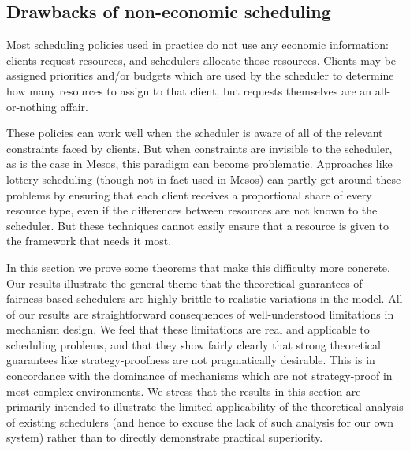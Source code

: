 \documentclass{acm_proc_article-sp}
\begin{document}
\subsection{Drawbacks of non-economic scheduling}\label{drawbacks}
Most scheduling policies used in practice do not use any economic information: clients request resources, and schedulers allocate those resources. Clients may be assigned priorities and/or budgets which are used by the scheduler to determine how many resources to assign to that client, but requests themselves are an all-or-nothing affair.

These policies can work well when the scheduler is aware of all of the relevant constraints faced by clients. But when constraints are invisible to the scheduler, as is the case in Mesos, this paradigm can become problematic. Approaches like lottery scheduling (though not in fact used in Mesos) can partly get around these problems by ensuring that each client receives a proportional share of every resource type, even if the differences between resources are not known to the scheduler. But these techniques cannot easily ensure that a resource is given to the framework that needs it most.

In this section we prove some theorems that make this difficulty more concrete. Our results illustrate the general theme that the theoretical guarantees of fairness-based schedulers are highly brittle to realistic variations in the model. All of our results are straightforward consequences of well-understood limitations in mechanism design. We feel that these limitations are real and applicable to scheduling problems, and that they show fairly clearly that strong theoretical guarantees like strategy-proofness are not pragmatically desirable. This is in concordance with the dominance of mechanisms which are not strategy-proof in most complex environments. We stress that the results in this section are primarily intended to illustrate the limited applicability of the theoretical analysis of existing schedulers (and hence to excuse the lack of such analysis for our own system) rather than to directly demonstrate practical superiority.
\end{document}
